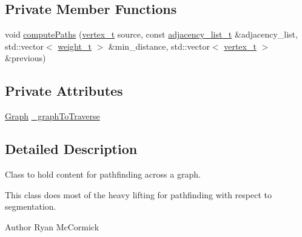 \subsection*{Private Member Functions}
\begin{DoxyCompactItemize}
\item 
void \hyperlink{classDijkstraPathfinder_a2758373bc41b0b23152d4dafcccb74bf}{compute\-Paths} (\hyperlink{dijkstraPathfinding_8h_af4d7cdf2478501dc15b627a84f3f4073}{vertex\-\_\-t} source, const \hyperlink{dijkstraPathfinding_8h_a8c1d6029622c85b0c047b344a90a6f84}{adjacency\-\_\-list\-\_\-t} \&adjacency\-\_\-list, std\-::vector$<$ \hyperlink{dijkstraPathfinding_8h_ac7889bf9b3596f63c57011af217212dd}{weight\-\_\-t} $>$ \&min\-\_\-distance, std\-::vector$<$ \hyperlink{dijkstraPathfinding_8h_af4d7cdf2478501dc15b627a84f3f4073}{vertex\-\_\-t} $>$ \&previous)
\end{DoxyCompactItemize}
\subsection*{Private Attributes}
\begin{DoxyCompactItemize}
\item 
\hyperlink{classGraph}{Graph} \hyperlink{classDijkstraPathfinder_ab33602aec0ee4c2060def95da74b09a7}{\-\_\-graph\-To\-Traverse}
\end{DoxyCompactItemize}


\subsection{Detailed Description}
Class to hold content for pathfinding across a graph. 

This class does most of the heavy lifting for pathfinding with respect to segmentation. \begin{DoxyAuthor}{Author}
Ryan Mc\-Cormick 
\end{DoxyAuthor}


